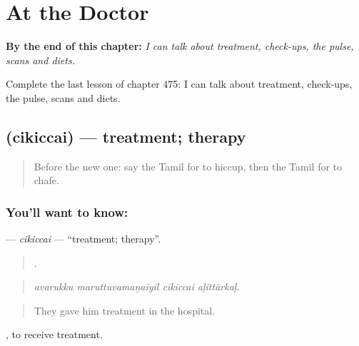
\chapter{At the Doctor}
\label{ch:ta-at-the-doctor}

\begin{chapteropening}
\textbf{By the end of this chapter:} \emph{I can talk about treatment, check-ups, the pulse, scans and diets.}

Complete the last lesson of chapter 475: I can talk about treatment, check-ups, the pulse, scans and diets.
\end{chapteropening}

\section[\texorpdfstring{\ta{சிகிச்சை} (cikiccai)}{சிகிச்சை (cikiccai)}]{ (cikiccai) — treatment; therapy}

\label{lesson:TA-C475-cikiccai}



\begin{quote}
Before the new one: say the Tamil for to hiccup, then the Tamil for to chafe.
\end{quote}

\subsection*{You'll want to know: }
\textbf{} — \emph{cikiccai} — \textquotedblleft{}treatment; therapy\textquotedblright{}.

\begin{quote}
   .
\end{quote}

\begin{quote}
\emph{avarukku maruttuvamaṉaiyil cikiccai aḷittārkaḷ.}
\end{quote}

\begin{quote}
They gave him treatment in the hospital.
\end{quote}

 , to receive treatment.

